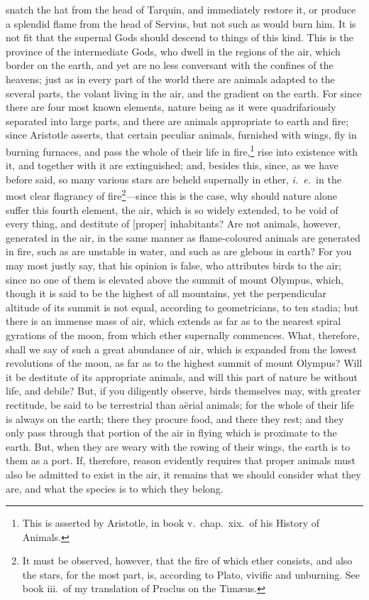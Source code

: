 \documentclass{article}
\begin{document}
snatch the hat from the head of Tarquin, and immediately restore it, or produce
a splendid flame from the head of Servius, but not such as would burn him. It
is not fit that the supernal Gods should descend to things of this kind. This
is the province of the intermediate Gods, who dwell in the regions of the air,
which border on the earth, and yet are no less conversant with the confines of
the heavens; just as in every part of the world there are animals adapted to
the several parts, the volant living in the air, and the gradient on the earth.
For since there are four most known elements, nature being as it were
quadrifariously separated into large parts, and there are animals appropriate
to earth and fire; since Aristotle asserts, that certain peculiar animals,
furnished with wings, fly in burning furnaces, and pass the whole of their life
in fire,\footnote{This is asserted by Aristotle, in book v.~chap.~xix.~of his
History of Animals.} rise into existence with it, and together with it
are extinguished; and, besides this, since, as we have before said, so many
various stars are beheld supernally in ether, \textit{i.~e.}~in the most clear
flagrancy of fire\footnote{It must be observed, however, that the fire of which
ether consists, and also the stars, for the most part, is, according to Plato,
vivific and unburning. See book iii.~of my translation of Proclus on
the Tim{\ae}us.}---since this is the case, why should nature alone suffer
this fourth element, the air, which is so widely extended, to be void of every
thing, and destitute of [proper] inhabitants?  Are not animals, however,
generated in the air, in the same manner as flame-coloured animals are
generated in fire, such as are unstable in water, and such as are glebous in
earth? For you may most justly say, that his opinion is false, who attributes
birds to the air; since no one of them is elevated above the summit of mount
Olympus, which, though it is said to be the highest of all mountains, yet the
perpendicular altitude of its summit is not equal, according to geometricians,
to ten stadia; but there is an immense mass of air, which extends as far as to
the nearest spiral gyrations of the moon, from which ether supernally
commences. What, therefore, shall we say of such a great abundance of air,
which is expanded from the lowest revolutions of the moon, as far as to the
highest summit of mount Olympus? Will it be destitute of its appropriate
animals, and will this part of nature be without life, and debile? But, if you
diligently observe, birds themselves may, with greater rectitude, be said to be
terrestrial than a\"{e}rial animals; for the whole of their life is always on
the earth; there they procure food, and there they rest; and they only pass
through that portion of the air in flying which is proximate to the earth. But,
when they are weary with the rowing of their wings, the earth is to them as a
port. If, therefore, reason evidently requires that proper animals must also be
admitted to exist in the air, it remains that we should consider what they are,
and what the species is to which they belong.
\end{document}
